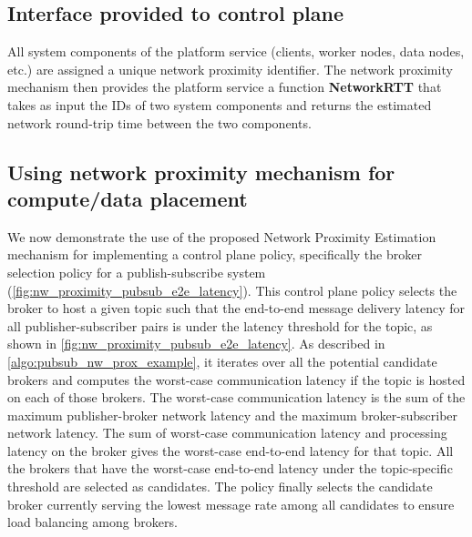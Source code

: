 \subsection{Interface provided to control plane}
All system components of the platform service (clients, worker nodes, data nodes, etc.) are assigned a unique network proximity identifier. The network proximity mechanism then provides the platform service a function \textbf{NetworkRTT} that takes as input the IDs of two system components and returns the estimated network round-trip time between the two components. 

\subsection{Using network proximity mechanism for compute/data placement}
\label{sec:policy_using_nw_prox}

We now demonstrate the use of the proposed Network Proximity Estimation mechanism for implementing a control plane policy, specifically the broker selection policy for a publish-subscribe system (\cref{fig:nw_proximity_pubsub_e2e_latency}). This control plane policy selects the broker to host a given topic such that the end-to-end message delivery latency for all publisher-subscriber pairs is under the latency threshold for the topic, as shown in \cref{fig:nw_proximity_pubsub_e2e_latency}. As described in \cref{algo:pubsub_nw_prox_example}, it iterates over all the potential candidate brokers and computes the worst-case communication latency if the topic is hosted on each of those brokers. The worst-case communication latency is the sum of the maximum publisher-broker network latency and the maximum broker-subscriber network latency. The sum of worst-case communication latency and processing latency on the broker gives the worst-case end-to-end latency for that topic. All the brokers that have the worst-case end-to-end latency under the topic-specific threshold are selected as candidates. The policy finally selects the candidate broker currently serving the lowest message rate among all candidates to ensure load balancing among brokers.

